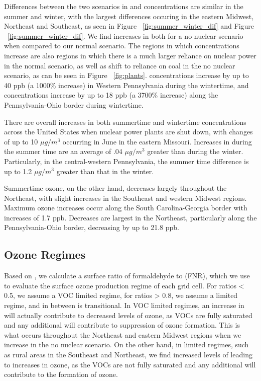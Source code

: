 \documentclass[12]{article}
\begin{document}
Differences between the two scenarios in  and  concentrations are similar in the summer and winter, with the largest differences occuring in the eastern Midwest, Northeast and Southeast, as seen in Figure ~\ref{fig:summer_winter_dif} and Figure ~\ref{fig:summer_winter_dif}. We find increases in both for a no nuclear scenario when compared to our normal scenario. The regions in which concentrations increase are also regions in which there is a much larger reliance on nuclear power in the normal scenario, as well as shift to reliance on coal in the no nuclear scenario, as can be seen in Figure ~\ref{fig:plants}.  concentrations increase by up to 40 ppb (a 1000\% increase) in Western Pennsylvania during the wintertime, and  concentrations increase by up to 18 ppb (a 3700\% increase) along the Pennsylvania-Ohio border during wintertime. 

There are overall increases in both summertime and wintertime  concentrations across the United States when nuclear power plants are shut down, with changes of up to 10 $\mu g/m^3$ occurring in June in the eastern Missouri. Increases in  during the summer time are an average of .04 $\mu g/m^3$ greater than during the winter. Particularly, in the central-western Pennsylvania, the summer time  difference is up to 1.2 $\mu g/m^3$ greater than that in the winter. 

Summertime ozone, on the other hand, decreases largely throughout the Northeast, with slight increases in the Southeast and western Midwest regions. Maximum ozone increases occur along the South Carolina-Georgia border with increases of 1.7 ppb. Decreases are largest in the Northeast, particularly along the Pennsylvania-Ohio border, decreasing by up to 21.8 ppb. 

\subsection{Ozone Regimes}
Based on \cite{jin_evaluating_2017}, we calculate a surface ratio of formaldehyde to  (FNR), which we use to evaluate the surface ozone production regime of each grid cell. For ratios < 0.5, we assume a VOC limited regime, for ratios > 0.8, we assume a  limited regime, and in between is transitional. In VOC limited regimes, an increase in  will actually contribute to decreased levels of ozone, as VOCs are fully saturated and any additional  will contribute to suppression of ozone formation. This is what occurs throughout the Northeast and eastern Midwest regions when we increase  in the no nuclear scenario. On the other hand, in  limited regimes, such as rural areas in the Southeast and Northeast, we find increased levels of  leading to increases in ozone, as the VOCs are not fully saturated and any additional  will contribute to the formation of ozone.  
\end{document}
